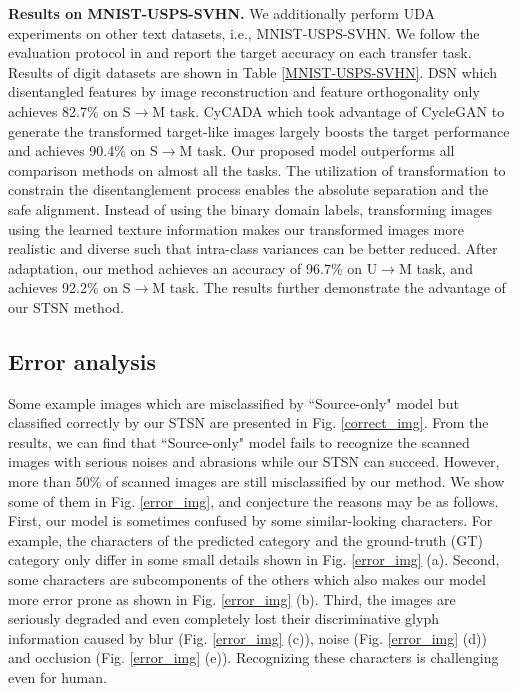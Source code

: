 \documentclass[10pt,journal,compsoc,twocolumn ]{IEEEtran}
\begin{document}
\textbf{Results on MNIST-USPS-SVHN.} %
We additionally perform UDA experiments on other text datasets, i.e., MNIST-USPS-SVHN. We follow the evaluation protocol in \cite{hoffman2018cycada,long2018conditional} and report the target accuracy on each transfer task. Results of digit datasets are shown in Table \ref{MNIST-USPS-SVHN}. DSN \cite{bousmalis2016domain} which disentangled features by image reconstruction and feature orthogonality only achieves 82.7\% on S$\rightarrow$M task. %
CyCADA \cite{hoffman2018cycada} which took advantage of CycleGAN \cite{zhu2017unpaired} to generate the transformed target-like images largely boosts the target performance and achieves 90.4\% on S$\rightarrow$M task. Our proposed model outperforms all comparison methods on almost all the tasks. The utilization of transformation to constrain the disentanglement process enables the absolute separation and the safe alignment. Instead of using the binary domain labels, transforming images using the learned texture information makes our transformed images more realistic and diverse such that intra-class variances can be better reduced. After adaptation, our method achieves an accuracy of 96.7\% on U$\rightarrow $M task, and achieves 92.2\% on S$\rightarrow $M task. The results further demonstrate the advantage of our STSN method.

\subsection{Error analysis}

Some example images which are misclassified by ``Source-only" model \cite{he2016deep} but classified correctly by our STSN are presented in Fig. \ref{correct_img}. From the results, we can find that ``Source-only" model fails to recognize the scanned images with serious noises and abrasions while our STSN can succeed. However, more than 50\% of scanned images are still misclassified by our method. We show some of them in Fig. \ref{error_img}, and conjecture the reasons may be as follows. First, our model is sometimes confused by some similar-looking characters. For example, the characters of the predicted category and the ground-truth (GT) category only differ in some small details shown in Fig. \ref{error_img} (a). Second, some characters are subcomponents of the others which also makes our model more error prone as shown in Fig. \ref{error_img} (b). Third, the images are seriously degraded and even completely lost their discriminative glyph information caused by blur (Fig. \ref{error_img} (c)), noise (Fig. \ref{error_img} (d)) and occlusion (Fig. \ref{error_img} (e)). Recognizing these characters is challenging even for human.
\end{document}
